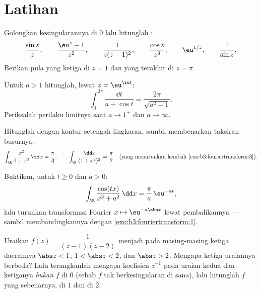 \section{Latihan}

\begin{exercise}[$\star$]\label{exo:b3:residues:1}
Golongkan kesingularannya di $0$ lalu hitunglah :
\[
\frac{\sin z}{z},\qquad
\frac{\eu^z - 1}{z^2},\qquad
\frac{1}{z(z-1)^2},\qquad
\frac{\cos z}{z^3},\qquad
\eu^{1/z},\qquad
\frac1{\sin z} .
\]
Berikan pula  yang ketiga di $z = 1$ dan yang terakhir
di $z = \pi$.
\end{exercise}

\begin{exercise}[$\star$]\label{exo:b3:residues:2}
Untuk $a > 1$ hitunglah, lewat $z = \eu^{\iu t}$:
\[
\int_0^{2\pi}\frac{\dd t}{a + \cos t}
= \frac{2\pi}{\sqrt{a^2 - 1}} .
\]
Periksalah perilaku limitnya saat $a \to 1^+$ dan $a \to \infty$.
\end{exercise}

\begin{exercise}[$\star\star$]\label{exo:b3:residues:3}
Hitunglah dengan kontur setengah lingkaran, sambil membenarkan taksiran busurnya:
\[
\int_\R\frac{x^2}{1 + x^6}\,\dd x = \frac\pi3,
\qquad
\int_\R\frac{\dd x}{(1 + x^2)^{2}} = \frac\pi2
\quad\text{(yang menurunkan kembali \cref{exo:b3:fouriertransform:3})}.
\]
\end{exercise}

\begin{exercise}[$\star\star$]\label{exo:b3:residues:4}
Buktikan, untuk $t \geq 0$ dan $a > 0$:
\[
\int_\R\frac{\cos(tx)}{x^2 + a^2}\,\dd x =
\frac{\pi}{a}\,\eu^{-at},
\]
lalu turunkan transformasi Fourier $x \mapsto \eu^{-a\abs
x}$ lewat pembalikannya --- sambil membandingkannya dengan
\cref{exo:b3:fouriertransform:1}.
\end{exercise}

\begin{exercise}[$\star\star$]\label{exo:b3:residues:5}
Uraikan $f(z) = \dfrac1{(z-1)(z-2)}$ menjadi  pada masing-masing
ketiga daerahnya $\abs z < 1$, $1 < \abs z < 2$, dan $\abs z >
2$. Mengapa ketiga uraiannya berbeda? Lalu terangkanlah mengapa
koefisien $z^{-1}$ pada uraian kedua dan ketiganya \emph{bukan}
 $f$ di $0$ (sebab $f$ tak berkesingularan
di sana), lalu hitunglah  $f$ yang sebenarnya, di $1$ dan di
$2$.
\end{exercise}

